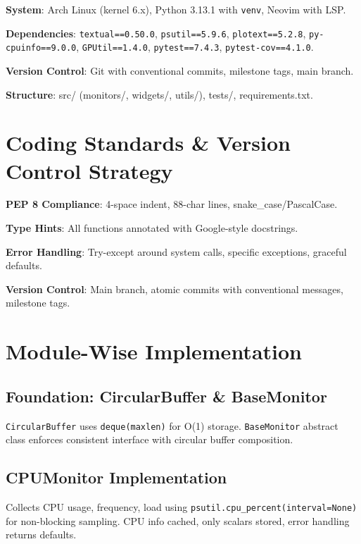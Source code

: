 \documentclass[12pt,a4paper,oneside]{report}
\begin{document}
\textbf{System}: Arch Linux (kernel 6.x), Python 3.13.1 with \texttt{venv}, Neovim with LSP.

\textbf{Dependencies}: \texttt{textual==0.50.0}, \texttt{psutil==5.9.6}, \texttt{plotext==5.2.8}, \texttt{py-cpuinfo==9.0.0}, \texttt{GPUtil==1.4.0}, \texttt{pytest==7.4.3}, \texttt{pytest-cov==4.1.0}.

\textbf{Version Control}: Git with conventional commits, milestone tags, main branch.

\textbf{Structure}: src/ (monitors/, widgets/, utils/), tests/, requirements.txt.

\section{Coding Standards \& Version Control Strategy}
\label{sec:coding-standards}

\textbf{PEP 8 Compliance}: 4-space indent, 88-char lines, snake\_case/PascalCase.

\textbf{Type Hints}: All functions annotated with Google-style docstrings.

\textbf{Error Handling}: Try-except around system calls, specific exceptions, graceful defaults.

\textbf{Version Control}: Main branch, atomic commits with conventional messages, milestone tags.

\section{Module-Wise Implementation}
\label{sec:module-implementation}

\subsection{Foundation: CircularBuffer \& BaseMonitor}

\texttt{CircularBuffer} uses \texttt{deque(maxlen)} for O(1) storage. \texttt{BaseMonitor} abstract class enforces consistent interface with circular buffer composition.

\subsection{CPUMonitor Implementation}

Collects CPU usage, frequency, load using \texttt{psutil.cpu\_percent(interval=None)} for non-blocking sampling. CPU info cached, only scalars stored, error handling returns defaults.
\end{document}
